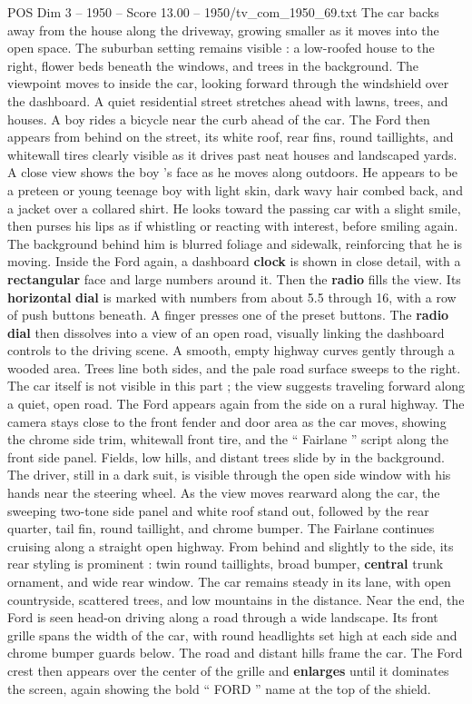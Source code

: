 \begin{textsample}{POS Dim 3 – 1950 – Score 13.00 – 1950/tv\_com\_1950\_69.txt}
The car backs away from the house along the driveway, growing smaller as it moves into the open space.
The suburban setting remains visible : a low-roofed house to the right, flower beds beneath the windows, and trees in the background.
The viewpoint moves to inside the car, looking forward through the windshield over the dashboard.
A quiet residential street stretches ahead with lawns, trees, and houses.
A boy rides a bicycle near the curb ahead of the car.
The Ford then appears from behind on the street, its white roof, rear fins, round taillights, and whitewall tires clearly visible as it drives past neat houses and landscaped yards.
A close view shows the boy ’s face as he moves along outdoors.
He appears to be a preteen or young teenage boy with light skin, dark wavy hair combed back, and a jacket over a collared shirt.
He looks toward the passing car with a slight smile, then purses his lips as if whistling or reacting with interest, before smiling again.
The background behind him is blurred foliage and sidewalk, reinforcing that he is moving.
Inside the Ford again, a dashboard \textbf{clock} is shown in close detail, with a \textbf{rectangular} face and large numbers around it.
Then the \textbf{radio} fills the view.
Its \textbf{horizontal} \textbf{dial} is marked with numbers from about 5.5 through 16, with a row of push buttons beneath.
A finger presses one of the preset buttons.
The \textbf{radio} \textbf{dial} then dissolves into a view of an open road, visually linking the dashboard controls to the driving scene.
A smooth, empty highway curves gently through a wooded area.
Trees line both sides, and the pale road surface sweeps to the right.
The car itself is not visible in this part ; the view suggests traveling forward along a quiet, open road.
The Ford appears again from the side on a rural highway.
The camera stays close to the front fender and door area as the car moves, showing the chrome side trim, whitewall front tire, and the “ Fairlane ” script along the front side panel.
Fields, low hills, and distant trees slide by in the background.
The driver, still in a dark suit, is visible through the open side window with his hands near the steering wheel.
As the view moves rearward along the car, the sweeping two-tone side panel and white roof stand out, followed by the rear quarter, tail fin, round taillight, and chrome bumper.
The Fairlane continues cruising along a straight open highway.
From behind and slightly to the side, its rear styling is prominent : twin round taillights, broad bumper, \textbf{central} trunk ornament, and wide rear window.
The car remains steady in its lane, with open countryside, scattered trees, and low mountains in the distance.
Near the end, the Ford is seen head-on driving along a road through a wide landscape.
Its front grille spans the width of the car, with round headlights set high at each side and chrome bumper guards below.
The road and distant hills frame the car.
The Ford crest then appears over the center of the grille and \textbf{enlarges} until it dominates the screen, again showing the bold “ FORD ” name at the top of the shield.

\end{textsample}

